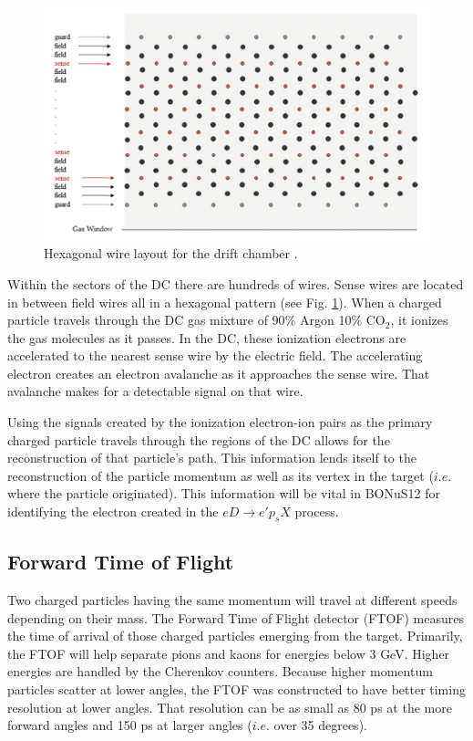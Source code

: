 \begin{figure}[H]
	\centering
	\includegraphics[width=0.8\linewidth]{figures/dc_wires.png}
	\caption[Hexagonal wire layout for the drift chamber.]{Hexagonal wire layout for the drift chamber \cite{clas12:DC}.}
	\label{fig:dc_wires}
\end{figure}

Within the sectors of the DC there are hundreds of wires. Sense wires are located in between field wires all in a hexagonal pattern (see Fig. \ref{fig:dc_wires}). When a charged particle travels through the DC gas mixture of 90$\%$ Argon 10$\%$ CO$_2$\cite{clas12:DC}, it ionizes the gas molecules as it passes. In the DC, these ionization electrons are accelerated to the nearest sense wire by the electric field. The accelerating electron creates an electron avalanche as it approaches the sense wire. That avalanche makes for a detectable signal on that wire.

Using the signals created by the ionization electron-ion pairs as the primary charged particle travels through the regions of the DC allows for the reconstruction of that particle's path. This information lends itself to the reconstruction of the particle momentum as well as its vertex in the target ($i.e.$ where the particle originated). This information will be vital in BONuS12 for identifying the electron created in the $eD \rightarrow e'p_sX$ process.

\subsection{Forward Time of Flight}
Two charged particles having the same momentum will travel at different speeds depending on their mass. The Forward Time of Flight detector (FTOF) measures the time of arrival of those charged particles emerging from the target. Primarily, the FTOF will help separate pions and kaons for energies below 3 GeV. Higher energies are handled by the Cherenkov counters. Because higher momentum particles scatter at lower angles, the FTOF was constructed to have better timing resolution at lower angles. That resolution can be as small as 80 ps at the more forward angles and 150 ps at larger angles ($i.e.$ over 35 degrees).\cite{clas12:FTOF}

